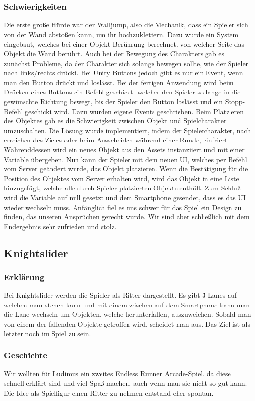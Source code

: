 \subsubsection{Schwierigkeiten}
Die erste große Hürde war der Walljump, also die Mechanik, dass ein Spieler sich von der Wand abstoßen kann, um ihr hochzuklettern. Dazu wurde ein System eingebaut, welches bei einer Objekt-Berührung berechnet, von welcher Seite das Objekt die Wand berührt. Auch bei der Bewegung des Charakters gab es zunächst Probleme, da der Charakter sich solange bewegen sollte, wie der Spieler nach links/rechts drückt. Bei Unity Buttons jedoch gibt es nur ein Event, wenn man den Button drückt und loslässt. Bei der fertigen Anwendung wird beim Drücken eines Buttons ein Befehl geschickt. welcher den Spieler so lange in die gewünschte Richtung bewegt, bis der Spieler den Button loslässt und ein Stopp-Befehl geschickt wird. Dazu wurden eigene Events geschrieben. Beim Platzieren des Objektes gab es die Schwierigkeit zwischen Objekt und Spielcharakter umzuschalten. Die Lösung wurde implementiert, indem der Spielercharakter, nach erreichen des Zieles oder beim Ausscheiden während einer Runde, einfriert. Währenddessen wird ein neues Objekt aus den Assets instanziiert und mit einer Variable übergeben. Nun kann der Spieler mit dem neuen UI, welches per Befehl vom Server geändert wurde, das Objekt platzieren. Wenn die Bestätigung für die Position des Objektes vom Server erhalten wird, wird das Objekt in eine Liste hinzugefügt, welche alle durch Spieler platzierten Objekte enthält. Zum Schluß wird die Variable auf null gesetzt und dem Smartphone gesendet, dass es das UI wieder wechseln muss. Anfänglich fiel es uns schwer für das Spiel ein Design zu finden, das unseren Ansprüchen gerecht wurde. Wir sind aber schließlich mit dem Endergebnis sehr zufrieden und stolz.
\subsection{Knightslider}
\subsubsection{Erklärung}
Bei Knightslider werden die Spieler als Ritter dargestellt. Es gibt 3 Lanes auf welchen man stehen kann und mit einem wischen auf dem Smartphone kann man die Lane wechseln um Objekten, welche herunterfallen, auszuweichen. Sobald man von einem der fallenden Objekte getroffen wird, scheidet man aus. Das Ziel ist als letzter noch im Spiel zu sein.
\subsubsection{Geschichte}
Wir wollten für Ludimus ein zweites Endless Runner Arcade-Spiel, da diese schnell erklärt sind und viel Spaß machen, auch wenn man sie nicht so gut kann. Die Idee als Spielfigur einen Ritter zu nehmen entstand eher spontan.
